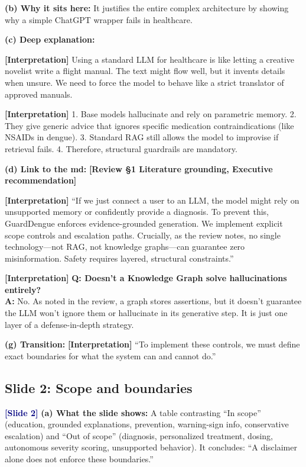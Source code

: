 \documentclass[11pt,a4paper]{article}
\newcommand{\origintag}[2]{\textcolor{#1}{\small\textbf{[#2]}}}
\begin{document}
\textbf{(b) Why it sits here:} It justifies the entire complex architecture by showing why a simple ChatGPT wrapper fails in healthcare.

\textbf{(c) Deep explanation:}
\begin{analogy}
\origintag{slate}{Interpretation} Using a standard LLM for healthcare is like letting a creative novelist write a flight manual. The text might flow well, but it invents details when unsure. We need to force the model to behave like a strict translator of approved manuals.
\end{analogy}
\origintag{slate}{Interpretation} 1. Base models hallucinate and rely on parametric memory. 2. They give generic advice that ignores specific medication contraindications (like NSAIDs in dengue). 3. Standard RAG still allows the model to improvise if retrieval fails. 4. Therefore, structural guardrails are mandatory.

\textbf{(d) Link to the md:} \origintag{amber}{Review \S1 Literature grounding, Executive recommendation}

\begin{sayit}
\origintag{slate}{Interpretation} ``If we just connect a user to an LLM, the model might rely on unsupported memory or confidently provide a diagnosis. To prevent this, GuardDengue enforces evidence-grounded generation. We implement explicit scope controls and escalation paths. Crucially, as the review notes, no single technology---not RAG, not knowledge graphs---can guarantee zero misinformation. Safety requires layered, structural constraints.''
\end{sayit}

\begin{qa}
\origintag{slate}{Interpretation} \textbf{Q: Doesn't a Knowledge Graph solve hallucinations entirely?} \\
\textbf{A:} No. As noted in the review, a graph stores assertions, but it doesn't guarantee the LLM won't ignore them or hallucinate in its generative step. It is just one layer of a defense-in-depth strategy.
\end{qa}
\textbf{(g) Transition:} \origintag{slate}{Interpretation} ``To implement these controls, we must define exact boundaries for what the system can and cannot do.''

\subsection{Slide 2: Scope and boundaries}
\origintag{navy}{Slide 2}
\textbf{(a) What the slide shows:} A table contrasting ``In scope'' (education, grounded explanations, prevention, warning-sign info, conservative escalation) and ``Out of scope'' (diagnosis, personalized treatment, dosing, autonomous severity scoring, unsupported behavior). It concludes: ``A disclaimer alone does not enforce these boundaries.''
\end{document}
